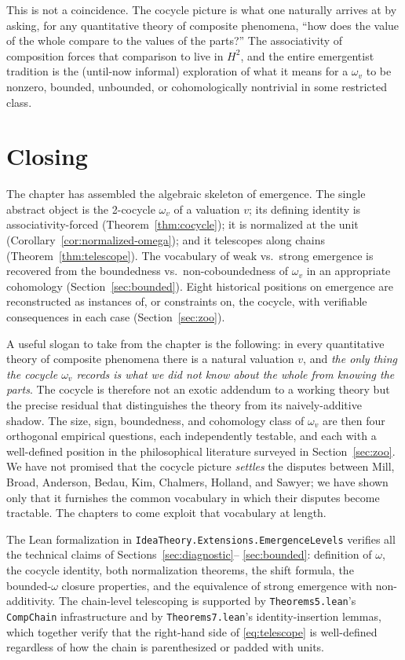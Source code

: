 This is not a coincidence. The cocycle picture is what one naturally
arrives at by asking, for any quantitative theory of composite phenomena,
``how does the value of the whole compare to the values of the parts?''
The associativity of composition forces that comparison to live in
$H^2$, and the entire emergentist tradition is the (until-now informal)
exploration of what it means for a $\omega_v$ to be nonzero, bounded,
unbounded, or cohomologically nontrivial in some restricted class.

\section{Closing}

The chapter has assembled the algebraic skeleton of emergence. The single
abstract object is the 2-cocycle $\omega_v$ of a valuation $v$; its
defining identity is associativity-forced (Theorem~\ref{thm:cocycle}); it
is normalized at the unit (Corollary~\ref{cor:normalized-omega}); and it
telescopes along chains (Theorem~\ref{thm:telescope}). The vocabulary of
weak vs.\ strong emergence is recovered from the boundedness vs.\
non-coboundedness of $\omega_v$ in an appropriate cohomology
(Section~\ref{sec:bounded}). Eight historical positions on emergence are
reconstructed as instances of, or constraints on, the cocycle, with
verifiable consequences in each case (Section~\ref{sec:zoo}).

A useful slogan to take from the chapter is the following: in every
quantitative theory of composite phenomena there is a natural valuation $v$,
and \emph{the only thing the cocycle $\omega_v$ records is what we did not
know about the whole from knowing the parts}. The cocycle is therefore not
an exotic addendum to a working theory but the precise residual that
distinguishes the theory from its naively-additive shadow. The size, sign,
boundedness, and cohomology class of $\omega_v$ are then four orthogonal
empirical questions, each independently testable, and each with a
well-defined position in the philosophical literature surveyed in
Section~\ref{sec:zoo}. We have not promised that the cocycle picture
\emph{settles} the disputes between Mill, Broad, Anderson, Bedau, Kim,
Chalmers, Holland, and Sawyer; we have shown only that it furnishes the
common vocabulary in which their disputes become tractable. The
chapters to come exploit that vocabulary at length.

The Lean formalization in \texttt{IdeaTheory.Extensions.EmergenceLevels}
verifies all the technical claims of Sections~\ref{sec:diagnostic}--%
\ref{sec:bounded}: definition of $\omega$, the cocycle identity, both
normalization theorems, the shift formula, the bounded-$\omega$ closure
properties, and the equivalence of strong emergence with non-additivity.
The chain-level telescoping is supported by \texttt{Theorems5.lean}'s
\texttt{CompChain} infrastructure and by \texttt{Theorems7.lean}'s
identity-insertion lemmas, which together verify that the right-hand
side of \eqref{eq:telescope} is well-defined regardless of how the chain is
parenthesized or padded with units.

